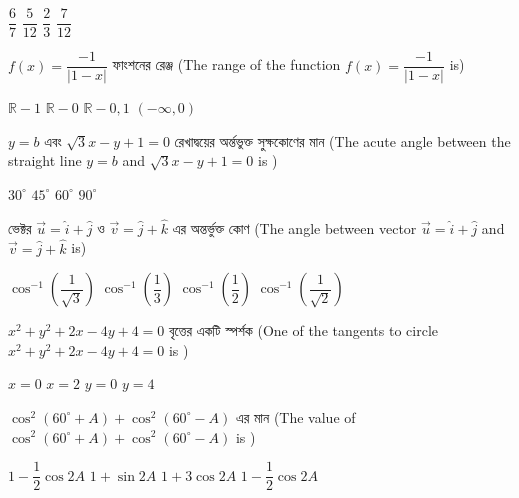 \documentclass[addpoints]{exam}
\begin{document}
\begin{questions}
\begin{oneparchoices}
\choice $ \dfrac{6}{7}$ 
\choice $ \dfrac{5}{12}$ 
\choice $ \dfrac{2}{3} $ 
\choice $ \dfrac{7}{12} $ 
\end{oneparchoices}

\question   $ f(x) = \dfrac{-1}{|1-x|} $  ফাংশনের রেঞ্জ (The range of the function $ f(x) = \dfrac{-1}{|1-x|} $ is)
 
\begin{oneparchoices}
\choice $ \mathbb{R}-{1} $
\choice $ \mathbb{R}-{0} $
\choice $ \mathbb{R}-{0,1} $
\choice  $ (-\infty, 0) $

\end{oneparchoices}

\question $ y=b $ এবং $ \sqrt{3}x-y+1=0 $ রেখাদ্বয়ের অর্ন্তভুক্ত সুক্ষকোণের মান (The acute angle between the straight line $ y=b $ and $ \sqrt{3}x-y+1=0 $ is ) 

\begin{oneparchoices}
\choice $ 30^{\circ} $
\choice $ 45^{\circ} $
\choice $ 60^{\circ} $
\choice $ 90^{\circ} $

\end{oneparchoices}


\question  ভেক্টর $ \vec{u} = \hat{i} + \hat{j} $ ও $ \vec{v} = \hat{j} + \hat{k} $ এর অন্তর্ভুক্ত কোণ (The angle between vector $ \vec{u} = \hat{i} + \hat{j} $ and  $ \vec{v} = \hat{j} + \hat{k} $ is)

\begin{oneparchoices}
\choice $ \cos^{-1}(\dfrac{1}{\sqrt{3}}) $
\choice $ \cos^{-1}(\dfrac{1}{3}) $
\choice $ \cos^{-1}(\dfrac{1}{2}) $
\choice $ \cos^{-1}(\dfrac{1}{\sqrt{2}}) $

\end{oneparchoices}

\question  $ x^{2} + y^{2}+2x-4y+4=0 $ বৃত্তের একটি স্পর্শক (One of the tangents to circle $ x^{2} + y^{2}+2x-4y+4=0 $ is ) 

\begin{oneparchoices}
\choice $ x =0 $
\choice $ x=2 $
\choice $ y=0 $
\choice  $ y=4 $

\end{oneparchoices}

\question  $ \cos^{2}(60^{\circ} + A) + \cos^{2}(60^{\circ} -A) $ এর মান (The value of  $ \cos^{2}(60^{\circ} + A) + \cos^{2}(60^{\circ} -A) $ is ) 

\begin{oneparchoices}
\choice $ 1-\dfrac{1}{2}\cos 2A $
\choice $ 1+\sin 2A $
\choice $ 1+3\cos 2A $ 
\choice $ 1-\dfrac{1}{2}\cos 2A $


\end{oneparchoices}
\end{questions}
\end{document}
